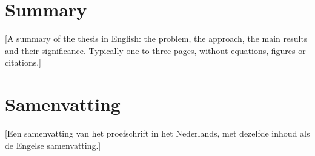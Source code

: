 \chapter*{Summary}

[A summary of the thesis in English: the problem, the approach, the main results and their significance. Typically one to three pages, without equations, figures or citations.]

\lipsum[1-2]

\chapter*{Samenvatting}

\begin{otherlanguage}{dutch}
[Een samenvatting van het proefschrift in het Nederlands, met dezelfde inhoud als de Engelse samenvatting.]

\lipsum[1-2]
\end{otherlanguage}
